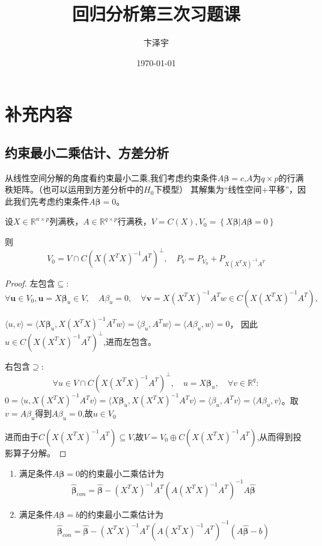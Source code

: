 \documentclass[cn,hazy,green,12pt,normal]{elegantnote}
\title{回归分析第三次习题课}
\author{卞泽宇}
\institute{USTC}
\date{\today}
\newcommand{\MR}{\mathbb R}
\numberwithin{equation}{section}
\numberwithin{subsection}{section}
\begin{document}
\maketitle

\tableofcontents

\section{补充内容}
\subsection{约束最小二乘估计、方差分析}
从线性空间分解的角度看约束最小二乘,我们考虑约束条件$A\bm\beta = c$,$A$为$q\times p$的行满秩矩阵。（也可以运用到方差分析中的$H_0$下模型）
其解集为“线性空间+平移”，因此我们先考虑约束条件$A\bm\beta=0$。
\begin{theorem}
    设$X \in \MR^{n\times p}$列满秩，$A \in \MR^{q\times p}$行满秩，$V=C(X),V_0=\left\{X\bm \beta | A\bm \beta = 0  \right\}$

    则\[V_0 = V \cap C(X(X^TX)^{-1}A^T)^{\perp},\quad P_V = P_{V_0}+P_{X(X^TX)^{-1}A^T}\]
\end{theorem}

\begin{proof}
    左包含$\subseteq$:
\[
    \forall \bm u \in V_0, \bm u = X\bm \beta_u \in V,\quad A
    \beta_u=0,\quad
    \forall \bm v = X(X^TX)^{-1}A^Tw\in C(X(X^TX)^{-1}A^T),
    \]
    
    $\langle u,v\rangle=\langle X\bm \beta_u,X(X^TX)^{-1}A^Tw \rangle=
    \langle \beta_u,A^Tw\rangle=\langle A
    \beta_u,w\rangle=0$，
    因此$u\in C(X(X^TX)^{-1}A^T)^{\perp}$,进而左包含。
    
\noindent 右包含$\supseteq$:
\[\forall u \in V\cap C(X(X^TX)^{-1}A^T)^{\perp}, \quad u=X\bm \beta_u ,\quad \forall v\in \MR^{q}:\]
$0 = \langle u,X(X^TX)^{-1}A^Tv\rangle =\langle X\bm \beta_u,X(X^TX)^{-1}A^Tv \rangle =
\langle \beta_u,A^Tv\rangle =\langle A\beta_u,v\rangle$。取$v = A\beta_u$得到$A\beta_u=0$,故$u\in V_0$

进而由于$C(X(X^TX)^{-1}A^T) \subseteq V$,故$V = V_0 \oplus C(X(X^TX)^{-1}A^T)$,从而得到投影算子分解。
\end{proof}

\begin{corollary}
    \begin{enumerate}
        \item 满足条件$A\bm\beta=0$的约束最小二乘估计为
        \[\hat{\bm\beta}_{con}=\hat{\bm\beta} - (X^TX)^{-1}A^T(A(X^TX)^{-1}A^T)^{-1}A\hat{\bm\beta}\]
        \item 满足条件$A\bm\beta=b$的约束最小二乘估计为
        \[\hat{\bm\beta}_{con}=\hat{\bm\beta} - (X^TX)^{-1}A^T(A(X^TX)^{-1}A^T)^{-1}(A\hat{\bm\beta}-b)\]
    \end{enumerate}
\end{corollary}
\end{document}
